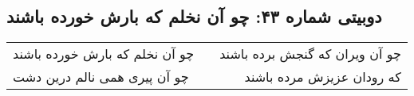\begin{center}
\section*{دوبیتی شماره ۴۳: چو آن نخلم که بارش خورده باشند}
\label{sec:043}
\begin{longtable}{l p{0.5cm} r}
چو آن نخلم که بارش خورده باشند
&&
چو آن ویران که گنجش برده باشند
\\
چو آن پیری همی نالم درین دشت
&&
که رودان عزیزش مرده باشند
\\
\end{longtable}
\end{center}

